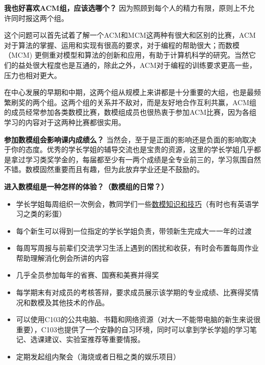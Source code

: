 \documentclass[xcolor={usenames,dvipsnames}]{beamer}
\begin{document}
\begin{frame}
\begin{alertblock}{\textbf{我也好喜欢ACM组，应该选哪个？}}
因为照顾到每个人的精力有限，原则上不允许同时报这两个组。

这个问题可以首先试着了解一个ACM和MCM这两种有很大和区别的比赛，ACM对于算法的掌握、运用和实现有很高的要求，对于编程的帮助很大；而数模（MCM) 更侧重对模型和算法的创新和应用，有助于计算机科学的研究。当然它们的益处很大程度也是互通的，除此之外，ACM对于编程的训练要求更高一些，压力也相对更大。

在中心发展的早期和中期，这两个组从规模上来讲都是十分重要的大组，也是最频繁刷奖的两个组。这两个组的关系并不敌对，而是友好地合作互利共赢，ACM组的成员经常参加各类数模比赛，数模组成员也很热衷于参加ACM比赛，因为各组学习的内容对于这两种比赛都很实用。
\end{alertblock}

\begin{block}{\textbf{参加数模组会影响课内成绩么？}}
当然会，至于是正面的影响还是负面的影响取决于你的态度。优秀的学长学姐的辅导交流也是宝贵的资源，这里的学长学姐几乎都是拿过学习类奖学金的，每届都至少有一两个成绩是全专业前三的，学习氛围自然不错。数模固然重要而且有趣，但为此放弃学业还是不鼓励的。
\end{block}
\end{frame}

\begin{frame}
\begin{block}{\textbf{进入数模组是一种怎样的体验？（数模组的日常？）}}
\begin{itemize}
   \item 学长学姐每周组织一次例会，教同学们一些\hyperlink{content}{数模知识和技巧}（有时也有英语学习之类的彩蛋）
   \item 每个新生可以得到一位指定的学长学姐负责，带领新生完成大一一年的过渡
   \item 每周写周报与前辈们交流学习生活上遇到的困扰和收获，有时会布置每周作业帮助理解消化例会所讲的内容
   \item 几乎全员参加每年的省赛、国赛和美赛并得奖
   \item 每学期末有对成员的考核答辩，要求成员展示该学期的专业成绩、比赛得奖情况和数模及其他技术的作品。
   \item 可以使用C103的公共电脑、书籍和网络资源（对大一不能带电脑的新生来说很重要），C103也提供了一个安静的自习环境，同时可以拿到学长学姐的学习笔记、选课建议、实验室推荐等重要情报。
   \item 定期发起组内聚会（海烧或者日租之类的娱乐项目）
\end{itemize}
\end{block}
\end{frame}
\end{document}

